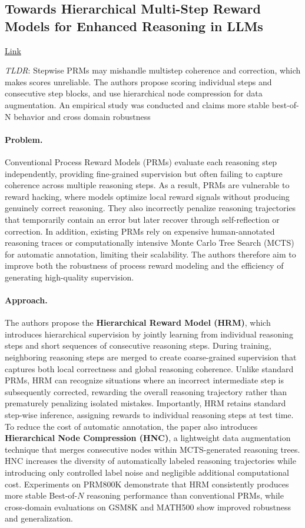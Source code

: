 \documentclass[11pt]{article}
\begin{document}
\subsection{Towards Hierarchical Multi-Step Reward Models for Enhanced Reasoning in LLMs}

\href{https://arxiv.org/abs/2503.13551}{Link}

\emph{TLDR}: Stepwise PRMs may mishandle multistep coherence and correction, which makes scores unreliable. The authors propose scoring individual steps and consecutive step blocks, and use hierarchical node compression for data augmentation. An empirical study was conducted and claims more stable best-of-N behavior and cross domain robustness

\paragraph{Problem.}
Conventional Process Reward Models (PRMs) evaluate each reasoning step independently, providing fine-grained supervision but often failing to capture coherence across multiple reasoning steps. As a result, PRMs are vulnerable to reward hacking, where models optimize local reward signals without producing genuinely correct reasoning. They also incorrectly penalize reasoning trajectories that temporarily contain an error but later recover through self-reflection or correction. In addition, existing PRMs rely on expensive human-annotated reasoning traces or computationally intensive Monte Carlo Tree Search (MCTS) for automatic annotation, limiting their scalability. The authors therefore aim to improve both the robustness of process reward modeling and the efficiency of generating high-quality supervision.  

\paragraph{Approach.}
The authors propose the \textbf{Hierarchical Reward Model (HRM)}, which introduces hierarchical supervision by jointly learning from individual reasoning steps and short sequences of consecutive reasoning steps. During training, neighboring reasoning steps are merged to create coarse-grained supervision that captures both local correctness and global reasoning coherence. Unlike standard PRMs, HRM can recognize situations where an incorrect intermediate step is subsequently corrected, rewarding the overall reasoning trajectory rather than prematurely penalizing isolated mistakes. Importantly, HRM retains standard step-wise inference, assigning rewards to individual reasoning steps at test time. To reduce the cost of automatic annotation, the paper also introduces \textbf{Hierarchical Node Compression (HNC)}, a lightweight data augmentation technique that merges consecutive nodes within MCTS-generated reasoning trees. HNC increases the diversity of automatically labeled reasoning trajectories while introducing only controlled label noise and negligible additional computational cost. Experiments on PRM800K demonstrate that HRM consistently produces more stable Best-of-$N$ reasoning performance than conventional PRMs, while cross-domain evaluations on GSM8K and MATH500 show improved robustness and generalization.  
\end{document}
